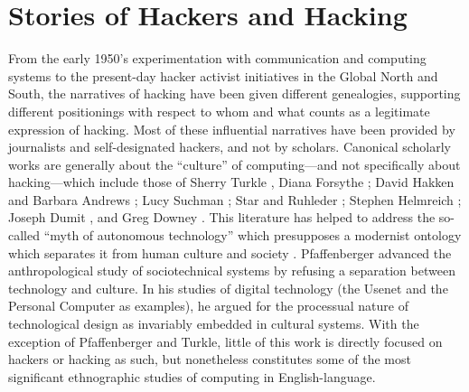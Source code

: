 \documentclass[10pt,letter,oneside]{scrartcl}
\begin{document}
\section*{Stories of Hackers and Hacking}

From the early 1950's experimentation with communication and computing systems
to the present-day hacker activist initiatives in the Global North and South,
the narratives of hacking have been given different genealogies, supporting
different positionings with respect to whom and what counts as a legitimate
expression of hacking.  Most of these influential narratives have been provided
by journalists and self-designated hackers, and not by scholars.  Canonical
scholarly works are generally about the ``culture'' of computing---and not
specifically about hacking---which include those of Sherry Turkle
\cite*{turkle_life_1995,turkle_second_1984}, Diana Forsythe
\cite*{forsythe_studying_2001}; David Hakken and Barbara Andrews
\cite*{hakken_computing_1993}; Lucy Suchman \cite*{suchman_plans_1987}; Star and
Ruhleder \cite*{star_infrastructure_1996}; Stephen Helmreich
\cite*{helmreich_silicon_1998}; Joseph Dumit \cite*{dumit_picturing_2004}, and
Greg Downey \cite*{downey_machine_1998}. This literature has helped to address
the so-called ``myth of autonomous technology'' which presupposes a modernist
ontology which separates it from human culture and
society \parencite{latour_wehave_2008,winner_auto_1978}.  Pfaffenberger
\cite*{pfaffenberger_social_1992} advanced the anthropological study of
sociotechnical systems by refusing a separation between technology and
culture. In his studies of digital technology (the Usenet and the Personal
Computer as examples), he argued for the processual nature of technological
design as invariably embedded in cultural systems. With the exception of
Pfaffenberger and Turkle, little of this work is directly focused on hackers or
hacking as such, but nonetheless constitutes some of the most significant
ethnographic studies of computing in English-language.
\end{document}
